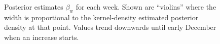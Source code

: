 \documentclass[thesis.tex]{subfiles}
\begin{document}
\begin{figure}
    \caption[Posterior estimates of $\beta_w$]{%
        Posterior estimates $\beta_w$ for each week.
        Shown are ``violins'' where the width is proportional to the kernel-density estimated posterior density at that point.
        Values trend downwards until early December when an increase starts.
    }
    \label{SEIR:fig:beta-walk}
\end{figure}
\end{document}
